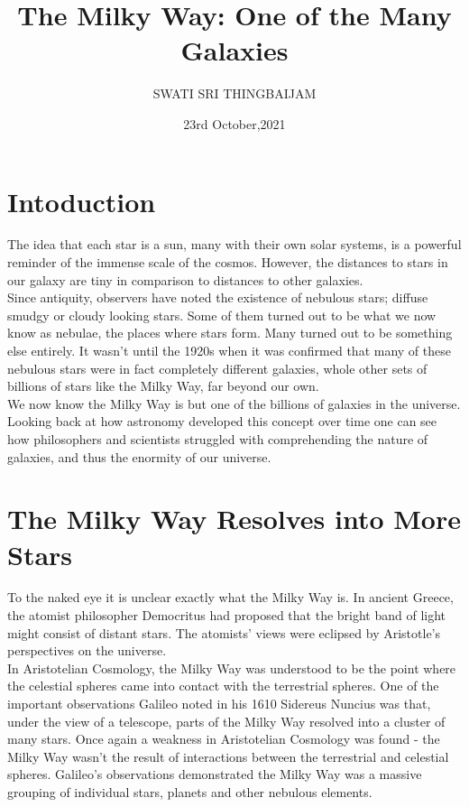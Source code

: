\documentclass[16pt, a4 paper,two column]{article}
\title{\textbf{The Milky Way: One of the Many Galaxies}}
\author{SWATI SRI THINGBAIJAM}
\date{23rd October,2021}
\begin{document}
\maketitle
\section{Intoduction}
The idea that each star is a sun, many with their own solar systems, is a powerful reminder of the immense scale of the cosmos. However, the distances to stars in our galaxy are tiny in comparison to distances to other galaxies.\\  
Since antiquity, observers have noted the existence of nebulous stars; diffuse smudgy or cloudy looking stars. Some of them turned out to be what we now know as nebulae, the places where stars form. Many turned out to be something else entirely. It wasn't until the 1920s when it was confirmed that many of these nebulous stars were in fact completely different galaxies, whole other sets of billions of stars like the Milky Way, far beyond our own. \\ 

We now know the Milky Way is but one of the billions of galaxies in the universe. Looking back at how astronomy developed this concept over time one can see how philosophers and scientists struggled with comprehending the nature of galaxies, and thus the enormity of our universe.
\section{The Milky Way Resolves into More Stars}
To the naked eye it is unclear exactly what the Milky Way is. In ancient Greece, the atomist philosopher Democritus had proposed that the bright band of light might consist of distant stars. The atomists' views were eclipsed by Aristotle's perspectives on the universe.\\ 

In Aristotelian Cosmology, the Milky Way was understood to be the point where the celestial spheres came into contact with the terrestrial spheres. One of the important observations Galileo noted in his 1610 Sidereus Nuncius was that, under the view of a telescope, parts of the Milky Way resolved into a cluster of many stars. Once again a weakness in Aristotelian Cosmology was found - the Milky Way wasn't the result of interactions between the terrestrial and celestial spheres. Galileo's observations demonstrated the Milky Way was a massive grouping of individual stars, planets and other nebulous elements.
\end{document}

